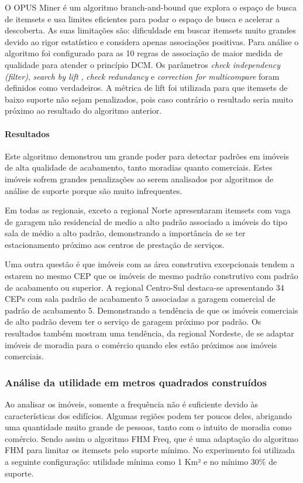 \documentclass[12pt]{article}
\begin{document}
O OPUS Miner é um algoritmo branch-and-bound que explora o espaço de busca de itemsets e usa limites eficientes para podar o espaço de busca e acelerar a descoberta. As suas limitações são: dificuldade em buscar itemsets muito grandes devido ao rigor estatístico e considera apenas associações positivas. Para análise o algoritmo foi configurado para as 10 regras de associação de maior medida de qualidade para atender o princípio DCM. Os parâmetros \textit{check independency (filter)}, \textit{search by lift} \cite{wiki:lift}, \textit{check redundancy} e \textit{correction for multicompare} foram definidos como verdadeiros. A métrica de lift foi utilizada para que itemsets de baixo suporte não sejam penalizados, pois caso contrário o resultado seria muito próximo ao resultado do algoritmo anterior.

\paragraph{Resultados}
Este algoritmo demonstrou um grande poder para detectar padrões em imóveis de alta qualidade de acabamento, tanto moradias quanto comerciais. Estes imóveis sofrem grandes penalizações ao serem analisados por algoritmos de análise de suporte porque são muito infrequentes.


Em todas as regionais, exceto a regional Norte apresentaram itemsets com vaga de garagem não residencial de medio a alto padrão associado a imóveis do tipo sala de médio a alto padrão, demonstrando a importância de se ter estacionamento próximo aos centros de prestação de serviços.

Uma outra questão é que imóveis com as área construtiva excepcionais tendem a estarem no mesmo CEP que os imóveis de mesmo padrão construtivo com padrão de acabamento ou superior. A regional Centro-Sul destaca-se apresentando 34 CEPs com sala padrão de acabamento 5 associadas a garagem comercial de padrão de acabamento 5. Demonstrando a tendência de que os imóveis comerciais de alto padrão devem ter o serviço de garagem próximo por padrão. Os resultados também mostram uma tendência, da regional Nordeste, de se adaptar imóveis de moradia para o comércio quando eles estão próximos aos imóveis comerciais.

\subsubsection{Análise da utilidade em metros quadrados construídos}
Ao analisar os imóveis, somente a frequência não é suficiente devido às características dos edifícios. Algumas regiões podem ter poucos deles, abrigando uma quantidade muito grande de pessoas, tanto com o intuito de moradia como comércio. Sendo assim o algoritmo FHM Freq, que é uma adaptação do algoritmo FHM \cite{fournier2014fhm} para limitar os itemsets pelo suporte mínimo. No experimento foi utilizada a seguinte configuração: utilidade mínima como 1 Km² e no mínimo 30\% de suporte.
\end{document}

